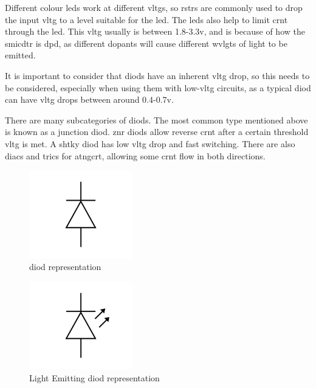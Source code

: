\documentclass[a4paper,11pt]{report}
\begin{document}
Different colour \gls{led}s work at different \gls{vltg}s, so \gls{rstr}s are commonly used to drop the input \gls{vltg} to a level suitable for the \gls{led}. The \gls{led}s also help to limit \gls{crnt} through the \gls{led}. This \gls{vltg} usually is between 1.8-3.3v, and is because of how the \gls{smicdtr} is \gls{dpd}, as different dopants will cause different \gls{wvlgt}s of light to be emitted.

It is important to consider that \gls{diod}s have an inherent \gls{vltg} drop, so this needs to be considered, especially when using them with low-\gls{vltg} circuits, as a typical \gls{diod} can have \gls{vltg} drops between around 0.4-0.7v.

There are many subcategories of \gls{diod}s. The most common type mentioned above is known as a junction \gls{diod}. \gls{znr} \gls{diod}s allow reverse \gls{crnt} after a certain threshold \gls{vltg} is met. A \gls{shtky} \gls{diod} has low \gls{vltg} drop and fast switching. There are also \gls{diac}s and \gls{tric}s for \gls{atngcrt}, allowing some \gls{crnt} flow in both directions.

\begin{figure}[H]
\centering
\includegraphics[width=0.4\textwidth]{diode1}
\caption{\gls{diod} representation}
\end{figure}

\begin{figure}[H]
\centering
\includegraphics[width=0.4\textwidth]{diode2}
\caption{Light Emitting \gls{diod} representation}
\end{figure}
\end{document}
